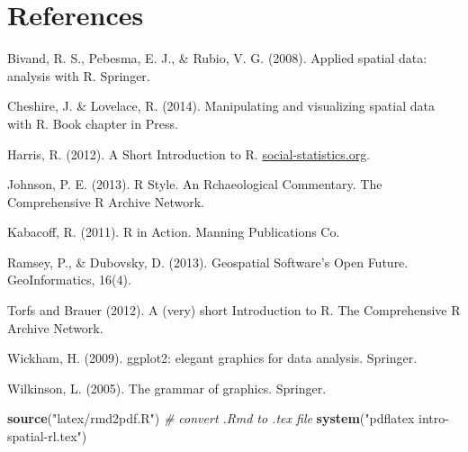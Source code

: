 \documentclass[]{article}
\newenvironment{Shaded}{}{}
\newcommand{\KeywordTok}[1]{\textcolor[rgb]{0.00,0.44,0.13}{\textbf{{#1}}}}
\newcommand{\StringTok}[1]{\textcolor[rgb]{0.25,0.44,0.63}{{#1}}}
\newcommand{\CommentTok}[1]{\textcolor[rgb]{0.38,0.63,0.69}{\textit{{#1}}}}
\newcommand{\NormalTok}[1]{{#1}}
\begin{document}
\newpage \section{References}\label{references}

Bivand, R. S., Pebesma, E. J., \& Rubio, V. G. (2008). Applied spatial
data: analysis with R. Springer.

Cheshire, J. \& Lovelace, R. (2014). Manipulating and visualizing
spatial data with R. Book chapter in Press.

Harris, R. (2012). A Short Introduction to R.
\href{http://www.social-statistics.org/}{social-statistics.org}.

Johnson, P. E. (2013). R Style. An Rchaeological Commentary. The
Comprehensive R Archive Network.

Kabacoff, R. (2011). R in Action. Manning Publications Co.

Ramsey, P., \& Dubovsky, D. (2013). Geospatial Software's Open Future.
GeoInformatics, 16(4).

Torfs and Brauer (2012). A (very) short Introduction to R. The
Comprehensive R Archive Network.

Wickham, H. (2009). ggplot2: elegant graphics for data analysis.
Springer.

Wilkinson, L. (2005). The grammar of graphics. Springer.

\begin{Shaded}
\begin{Highlighting}[]
\KeywordTok{source}\NormalTok{(}\StringTok{"latex/rmd2pdf.R"}\NormalTok{)  }\CommentTok{# convert .Rmd to .tex file}
\KeywordTok{system}\NormalTok{(}\StringTok{"pdflatex intro-spatial-rl.tex"}\NormalTok{)}
\end{Highlighting}
\end{Shaded}
\end{document}
